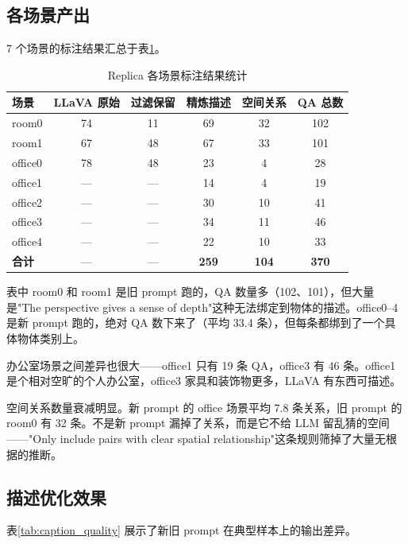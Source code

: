 \subsection{各场景产出}

7 个场景的标注结果汇总于表\ref{tab:scene_results}。

\begin{table}[H]
\centering
\caption{Replica 各场景标注结果统计}
\label{tab:scene_results}
\begin{tabular}{lccccc}
\toprule
\textbf{场景} & \textbf{LLaVA 原始} & \textbf{过滤保留} & \textbf{精炼描述} & \textbf{空间关系} & \textbf{QA 总数} \\
\midrule
room0 & 74 & 11 & 69 & 32 & 102 \\
room1 & 67 & 48 & 67 & 33 & 101 \\
office0 & 78 & 48 & 23 & 4 & 28 \\
office1 & --- & --- & 14 & 4 & 19 \\
office2 & --- & --- & 30 & 10 & 41 \\
office3 & --- & --- & 34 & 11 & 46 \\
office4 & --- & --- & 22 & 10 & 33 \\
\midrule
\textbf{合计} & --- & --- & \textbf{259} & \textbf{104} & \textbf{370} \\
\bottomrule
\end{tabular}
\end{table}

表中 room0 和 room1 是旧 prompt 跑的，QA 数量多（102、101），但大量是"The perspective gives a sense of depth"这种无法绑定到物体的描述。office0--4 是新 prompt 跑的，绝对 QA 数下来了（平均 33.4 条），但每条都绑到了一个具体物体类别上。

办公室场景之间差异也很大——office1 只有 19 条 QA，office3 有 46 条。office1 是个相对空旷的个人办公室，office3 家具和装饰物更多，LLaVA 有东西可描述。

空间关系数量衰减明显。新 prompt 的 office 场景平均 7.8 条关系，旧 prompt 的 room0 有 32 条。不是新 prompt 漏掉了关系，而是它不给 LLM 留乱猜的空间——"Only include pairs with clear spatial relationship"这条规则筛掉了大量无根据的推断。

\subsection{描述优化效果}

表\ref{tab:caption_quality} 展示了新旧 prompt 在典型样本上的输出差异。


